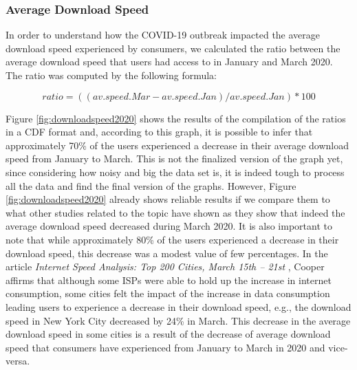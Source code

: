 \documentclass[conference,10pt]{IEEEtran}
\begin{document}
\subsubsection{Average Download Speed}
\label{sec:average-download-speed}

In order to understand how the COVID-19 outbreak impacted the average download speed experienced by consumers, we calculated the ratio between the average download speed that users had access to in January and March 2020. The ratio was computed by the following formula:

\begin{equation}
ratio= ((av.speed.Mar - av.speed.Jan)/ av.speed.Jan)*100
\end{equation}

Figure \ref{fig:downloadspeed2020} shows the results of the compilation of the ratios in a CDF format and, according to this graph, it is possible to infer that approximately 70\% of the users experienced a decrease in their average download speed from January to March. This is not the finalized version of the graph yet, since considering how noisy and big the data set is, it is indeed tough to process all the data and find the final version of the graphs. However, Figure \ref{fig:downloadspeed2020} already shows reliable results if we compare them to what other studies related to the topic have shown as they show that indeed the average download speed decreased during March 2020. It is also important to note that while approximately 80\% of the users experienced a decrease in their download speed, this decrease was a modest value of few percentages. In the article \textit{Internet Speed Analysis: Top 200 Cities, March 15th – 21st} \cite{cooper}, Cooper affirms that although some ISPs were able to hold up the increase in  internet consumption, some cities felt the impact of the increase in data consumption leading users to experience a decrease in their download speed, e.g., the download speed in New York City decreased by 24\% in March. This decrease in the average download speed in some cities is a result of the decrease of average download speed that consumers have experienced from January to March in 2020 and vice-versa.
\end{document}
